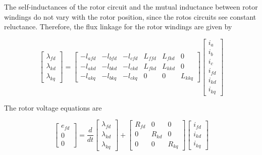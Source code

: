 The self-inductances of the rotor circuit and the mutual inductance between rotor windings do not vary with the rotor position, since the rotos circuits see constant reluctance. Therefore, the flux linkage for the rotor windings are given by

\begin{equation} \label{eq:FluxRotor}
	\begin{bmatrix}
		\lambda_{fd} \\
		\lambda_{kd} \\
		\lambda_{kq}
	\end{bmatrix}
	=
	\begin{bmatrix}
		-l_{afd} & -l_{bfd} & -l_{cfd} & L_{ffd} & L_{fkd} & 0 \\  
		-l_{akd} & -l_{bkd} & -l_{ckd} & L_{fkd} & L_{kkd} & 0 \\  
		-l_{akq} & -l_{bkq} & -l_{ckq} & 0       & 0       & L_{kkq}  
	\end{bmatrix}
	\begin{bmatrix}
		i_a \\
		i_b \\
		i_c \\
		i_{fd} \\
		i_{kd} \\
		i_{kq}
	\end{bmatrix}
\end{equation}

The rotor voltage equations are

\begin{equation} \label{eq:VotlageRotor}
	\begin{bmatrix}
		e_{fd} \\
		0 \\
		0
	\end{bmatrix}
	=
	\frac{d}{dt}
	\begin{bmatrix}
		\lambda_{fd} \\
		\lambda_{kd} \\
		\lambda_{kq}
	\end{bmatrix}
	+
	\begin{bmatrix}
		R_{fd} & 0 & 0 \\
		0 & R_{kd} & 0 \\
		0 & 0 & R_{kq}
	\end{bmatrix}
	\begin{bmatrix}
		i_{fd} \\
		i_{kd} \\
		i_{kq}
	\end{bmatrix}
\end{equation}

